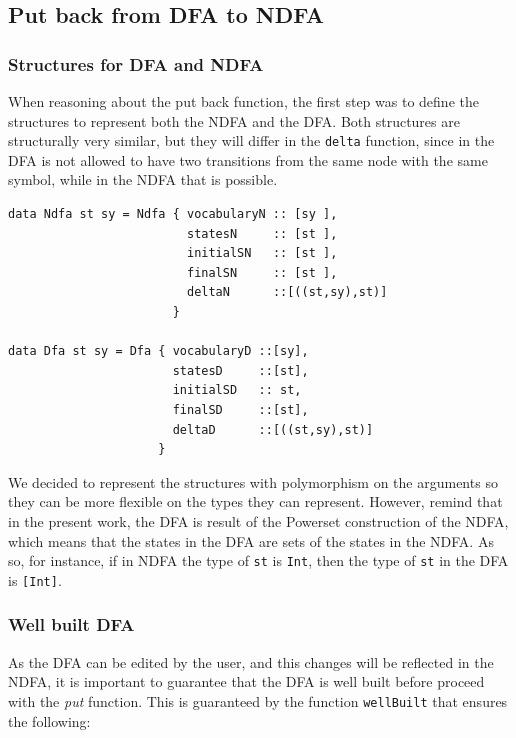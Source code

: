 \subsection{Put back from DFA to NDFA}

\subsubsection{Structures for DFA and NDFA}
When reasoning about the put back function, the first step was to define the structures to represent both the NDFA and the DFA. Both structures are structurally very similar, but they will differ in the \texttt{delta} function, since in the DFA is not allowed to have two transitions from the same node with the same symbol, while in the NDFA that is possible. 

\begin{verbatim}
data Ndfa st sy = Ndfa { vocabularyN :: [sy ],
                         statesN     :: [st ],
                         initialSN   :: [st ],
                         finalSN     :: [st ],
                         deltaN      ::[((st,sy),st)]
                       }
                   
data Dfa st sy = Dfa { vocabularyD ::[sy],
                       statesD     ::[st],
                       initialSD   :: st,
                       finalSD     ::[st],
                       deltaD      ::[((st,sy),st)]
                     }
\end{verbatim}

We decided to represent the structures with polymorphism on the arguments so they can be more flexible on the types they can represent. However, remind that in the present work, the DFA is result of the Powerset construction of the NDFA, which means that the states in the DFA are sets of the states in the NDFA. As so, for instance, if in NDFA the type of \texttt{st} is \texttt{Int}, then the type of \texttt{st} in the DFA is \texttt{[Int]}.

\subsubsection{Well built DFA}
As the DFA can be edited by the user, and this changes will be reflected in the NDFA, it is important to guarantee that the DFA is well built before proceed with the \textit{put} function. This is guaranteed by the function \texttt{wellBuilt} that ensures the following:

